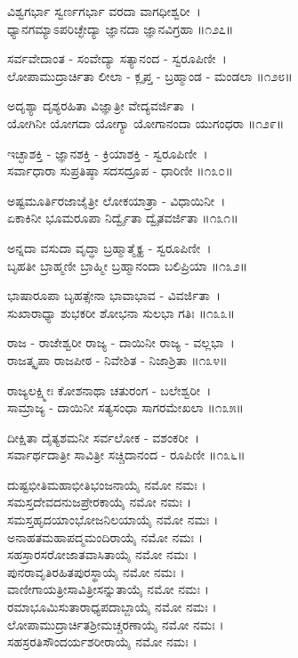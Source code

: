 ವಿಶ್ವಗರ್ಭಾ ಸ್ವರ್ಣಗರ್ಭಾ ವರದಾ ವಾಗಧೀಶ್ವರೀ~।\\
ಧ್ಯಾನಗಮ್ಯಾಽಪರಿಚ್ಛೇದ್ಯಾ ಜ್ಞಾನದಾ ಜ್ಞಾನವಿಗ್ರಹಾ ॥೧೨೭॥

ಸರ್ವವೇದಾಂತ - ಸಂವೇದ್ಯಾ ಸತ್ಯಾನಂದ - ಸ್ವರೂಪಿಣೀ~।\\
ಲೋಪಾಮುದ್ರಾರ್ಚಿತಾ ಲೀಲಾ - ಕ್ಲೃಪ್ತ - ಬ್ರಹ್ಮಾಂಡ - ಮಂಡಲಾ ॥೧೨೮॥

ಅದೃಶ್ಯಾ ದೃಶ್ಯರಹಿತಾ ವಿಜ್ಞಾತ್ರೀ ವೇದ್ಯವರ್ಜಿತಾ~।\\
ಯೋಗಿನೀ ಯೋಗದಾ ಯೋಗ್ಯಾ ಯೋಗಾನಂದಾ ಯುಗಂಧರಾ ॥೧೨೯॥

ಇಚ್ಛಾಶಕ್ತಿ - ಜ್ಞಾನಶಕ್ತಿ - ಕ್ರಿಯಾಶಕ್ತಿ - ಸ್ವರೂಪಿಣೀ~।\\
ಸರ್ವಾಧಾರಾ ಸುಪ್ರತಿಷ್ಠಾ ಸದಸದ್ರೂಪ - ಧಾರಿಣೀ ॥೧೩೦॥

ಅಷ್ಟಮೂರ್ತಿರಜಾಜೈತ್ರೀ ಲೋಕಯಾತ್ರಾ - ವಿಧಾಯಿನೀ~।\\
ಏಕಾಕಿನೀ ಭೂಮರೂಪಾ ನಿರ್ದ್ವೈತಾ ದ್ವೈತವರ್ಜಿತಾ ॥೧೩೧॥

ಅನ್ನದಾ ವಸುದಾ ವೃದ್ಧಾ ಬ್ರಹ್ಮಾತ್ಮೈಕ್ಯ - ಸ್ವರೂಪಿಣೀ~।\\
ಬೃಹತೀ ಬ್ರಾಹ್ಮಣೀ ಬ್ರಾಹ್ಮೀ ಬ್ರಹ್ಮಾನಂದಾ ಬಲಿಪ್ರಿಯಾ ॥೧೩೨॥

ಭಾಷಾರೂಪಾ ಬೃಹತ್ಸೇನಾ ಭಾವಾಭಾವ - ವಿವರ್ಜಿತಾ~।\\
ಸುಖಾರಾಧ್ಯಾ ಶುಭಕರೀ ಶೋಭನಾ ಸುಲಭಾ ಗತಿಃ ॥೧೩೩॥

ರಾಜ - ರಾಜೇಶ್ವರೀ ರಾಜ್ಯ - ದಾಯಿನೀ ರಾಜ್ಯ - ವಲ್ಲಭಾ~।\\
ರಾಜತ್ಕೃಪಾ ರಾಜಪೀಠ - ನಿವೇಶಿತ - ನಿಜಾಶ್ರಿತಾ ॥೧೩೪॥

ರಾಜ್ಯಲಕ್ಷ್ಮೀಃ ಕೋಶನಾಥಾ ಚತುರಂಗ - ಬಲೇಶ್ವರೀ~।\\
ಸಾಮ್ರಾಜ್ಯ - ದಾಯಿನೀ ಸತ್ಯಸಂಧಾ ಸಾಗರಮೇಖಲಾ ॥೧೩೫॥

ದೀಕ್ಷಿತಾ ದೈತ್ಯಶಮನೀ ಸರ್ವಲೋಕ - ವಶಂಕರೀ~।\\
ಸರ್ವಾರ್ಥದಾತ್ರೀ ಸಾವಿತ್ರೀ ಸಚ್ಚಿದಾನಂದ - ರೂಪಿಣೀ  ॥೧೩೬॥

ದುಷ್ಟಭೀತಿಮಹಾಭೀತಿಭಂಜನಾಯೈ ನಮೋ ನಮಃ ।\\
ಸಮಸ್ತದೇವದನುಜಪ್ರೇರಕಾಯೈ ನಮೋ ನಮಃ ।\\
ಸಮಸ್ತಹೃದಯಾಂಭೋಜನಿಲಯಾಯೈ ನಮೋ ನಮಃ ।\\
ಅನಾಹತಮಹಾಪದ್ಮಮಂದಿರಾಯೈ ನಮೋ ನಮಃ ।\\
ಸಹಸ್ರಾರಸರೋಜಾತವಾಸಿತಾಯೈ ನಮೋ ನಮಃ ।\\
ಪುನರಾವೃತಿರಹಿತಪುರಸ್ಥಾಯೈ ನಮೋ ನಮಃ ।\\
ವಾಣೀಗಾಯತ್ರೀಸಾವಿತ್ರೀಸನ್ನುತಾಯೈ ನಮೋ ನಮಃ ।\\
ರಮಾಭೂಮಿಸುತಾರಾಧ್ಯಪದಾಬ್ಜಾಯೈ ನಮೋ ನಮಃ ।\\
ಲೋಪಾಮುದ್ರಾರ್ಚಿತಶ್ರೀಮಚ್ಚರಣಾಯೈ ನಮೋ ನಮಃ ।\\
ಸಹಸ್ರರತಿಸೌಂದರ್ಯಶರೀರಾಯೈ ನಮೋ ನಮಃ ।


